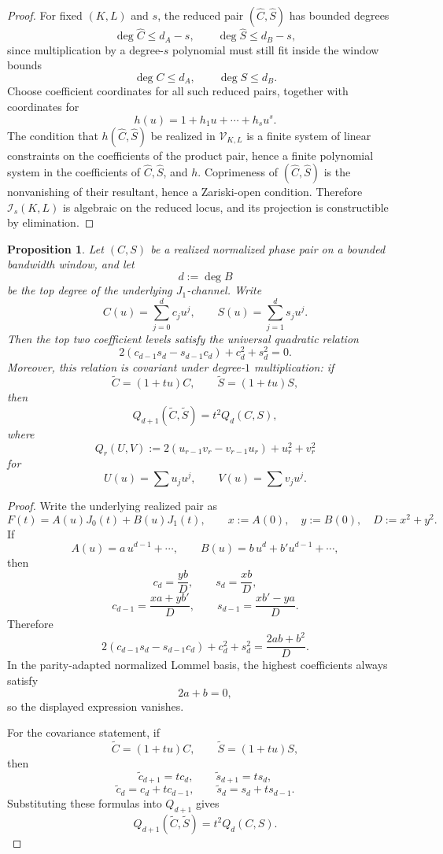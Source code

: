 \documentclass[11pt,reqno]{amsart}
\newtheorem{proposition}[theorem]{Proposition}
\theoremstyle{definition}
\begin{document}
\begin{proof}
For fixed $(K,L)$ and $s$, the reduced pair $(\widehat C,\widehat S)$ has bounded degrees
\[
\deg \widehat C\le d_A-s,
\qquad
\deg \widehat S\le d_B-s,
\]
since multiplication by a degree-$s$ polynomial must still fit inside the window bounds
\[
\deg C\le d_A,
\qquad
\deg S\le d_B.
\]
Choose coefficient coordinates for all such reduced pairs, together with coordinates for
\[
h(u)=1+h_1u+\cdots+h_su^s.
\]
The condition that $h(\widehat C,\widehat S)$ be realized in $\mathcal V_{K,L}$ is a finite
system of linear constraints on the coefficients of the product pair, hence a finite polynomial
system in the coefficients of $\widehat C,\widehat S$, and $h$. Coprimeness of
$(\widehat C,\widehat S)$ is the nonvanishing of their resultant, hence a Zariski-open
condition. Therefore $\mathcal I_s(K,L)$ is algebraic on the reduced locus, and its projection
is constructible by elimination.
\end{proof}

\begin{proposition}\label{prop:top-order-quadric}
Let $(C,S)$ be a realized normalized phase pair on a bounded bandwidth window, and let
\[
d:=\deg B
\]
be the top degree of the underlying $J_1$-channel. Write
\[
C(u)=\sum_{j=0}^{d} c_j u^j,
\qquad
S(u)=\sum_{j=1}^{d} s_j u^j.
\]
Then the top two coefficient levels satisfy the universal quadratic relation
\[
2(c_{d-1}s_d-s_{d-1}c_d)+c_d^2+s_d^2=0.
\]
Moreover, this relation is covariant under degree-$1$ multiplication: if
\[
\widetilde C=(1+tu)C,
\qquad
\widetilde S=(1+tu)S,
\]
then
\[
Q_{d+1}(\widetilde C,\widetilde S)=t^2 Q_d(C,S),
\]
where
\[
Q_r(U,V):=2(u_{r-1}v_r-v_{r-1}u_r)+u_r^2+v_r^2
\]
for
\[
U(u)=\sum u_j u^j,
\qquad
V(u)=\sum v_j u^j.
\]
\end{proposition}

\begin{proof}
Write the underlying realized pair as
\[
F(t)=A(u)J_0(t)+B(u)J_1(t),
\qquad
x:=A(0),\quad y:=B(0),\quad D:=x^2+y^2.
\]
If
\[
A(u)=a\,u^{d-1}+\cdots,
\qquad
B(u)=b\,u^d+b' u^{d-1}+\cdots,
\]
then
\[
c_d=\frac{yb}{D},
\qquad
s_d=\frac{xb}{D},
\]
\[
c_{d-1}=\frac{xa+yb'}{D},
\qquad
s_{d-1}=\frac{xb'-ya}{D}.
\]
Therefore
\[
2(c_{d-1}s_d-s_{d-1}c_d)+c_d^2+s_d^2
=
\frac{2ab+b^2}{D}.
\]
In the parity-adapted normalized Lommel basis, the highest coefficients always satisfy
\[
2a+b=0,
\]
so the displayed expression vanishes.

For the covariance statement, if
\[
\widetilde C=(1+tu)C,
\qquad
\widetilde S=(1+tu)S,
\]
then
\[
\widetilde c_{d+1}=t c_d,
\qquad
\widetilde s_{d+1}=t s_d,
\]
\[
\widetilde c_d=c_d+t c_{d-1},
\qquad
\widetilde s_d=s_d+t s_{d-1}.
\]
Substituting these formulas into $Q_{d+1}$ gives
\[
Q_{d+1}(\widetilde C,\widetilde S)=t^2Q_d(C,S).
\]
\end{proof}
\end{document}
